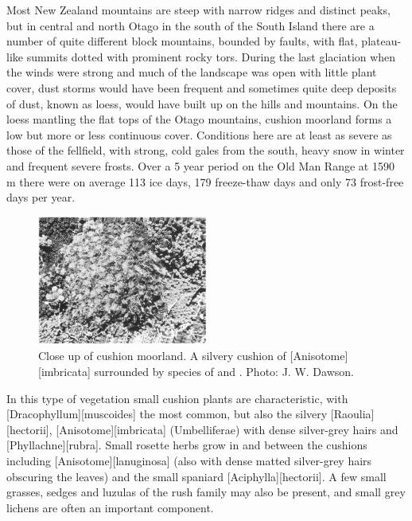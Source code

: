 Most New Zealand mountains are steep with narrow ridges and distinct peaks, but in central and north Otago in the south of the South Island there are a number of quite different block mountains, bounded by faults, with flat, plateau-like summits dotted with prominent rocky tors.
During the last glaciation when the winds were strong and much of the landscape was open with little plant cover, dust storms would have been frequent and sometimes quite deep deposits of dust, known as loess, would have built up on the hills and mountains.
On the loess mantling the flat tops of the Otago mountains, cushion moorland forms a low but more or less continuous cover.
Conditions here are at least as severe as those of the fellfield, with strong, cold gales from the south, heavy snow in winter and frequent severe frosts.
Over a 5 year period on the Old Man Range at 1590 m there were on average 113 ice days, 179 freeze-thaw days and only 73 frost-free days per year.

\begin{figure}
	\includegraphics[width=0.5\textwidth]{graphics/figure114cushion-moorland.jpg}
	\centering
	\caption[Close up of cushion moorland]{Close up of cushion moorland.
A silvery cushion of [Anisotome][imbricata] surrounded by species of  and .
	Photo: J. W. Dawson.}%
	\label{fig:114cushion-moorland}
\end{figure}

In this type of vegetation small cushion plants are characteristic, with [Dracophyllum][muscoides] the most common, but also the silvery [Raoulia][hectorii], [Anisotome][imbricata] (Umbelliferae) with dense silver-grey hairs and [Phyllachne][rubra].
Small rosette herbs grow in and between the cushions including [Anisotome][lanuginosa] (also with dense matted silver-grey hairs obscuring the leaves) and the small spaniard [Aciphylla][hectorii].
A few small grasses, sedges and luzulas of the rush family may also be present, and small grey lichens are often an important component.

